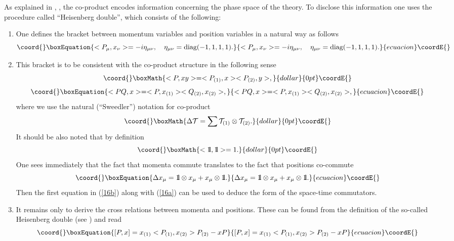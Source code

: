 \documentclass  [12pt] {article}
\def\bbbone{{\mathchoice {\rm 1\mskip-4mu l} {\rm 1\mskip-4mu l}
{\rm 1\mskip-4.5mu l} {\rm 1\mskip-5mu l}}}
\begin{document}
As explained in \cite{crossalg}, \cite{luno}, \cite{Kowalski-Glikman:2002jr}
the co-product encodes information concerning the phase space of the theory. To
disclose this information one uses the procedure called ``Heisenberg double'',
which consists of the following:

\begin{enumerate}
\item One defines the bracket \myHighlight{$<\star, \star>$}\coordHE{} between momentum variables \coordHE{} and position variables \coordHE{} in
a natural way as follows
\begin{equation}\coord{}\boxEquation{\label{16a}
 <P_\mu, x_\nu> =  -i \eta_{\mu\nu}, \quad \eta_{\mu\nu} = \mbox{diag}(-1,1,1,1).
}{<P_\mu, x_\nu> =  -i \eta_{\mu\nu}, \quad \eta_{\mu\nu} = \mbox{diag}(-1,1,1,1).
}{ecuacion}\coordE{}\end{equation}
\item This bracket is to be consistent with the co-product structure in the following sense
$$\coord{}\boxMath{
 <P, xy> = <P_{(1)}, x><P_{(2)}, y>,
 }{dollar}{0pt}\coordE{}$$
 \begin{equation}\coord{}\boxEquation{\label{16b}
 <PQ,x> =<P, x_{(1)}><Q_{(2)}, x_{(2)}>,
}{<PQ,x> =<P, x_{(1)}><Q_{(2)}, x_{(2)}>,
}{ecuacion}\coordE{}\end{equation}
where we use the natural (``Sweedler'') notation for co-product $$\coord{}\boxMath{\Delta {\cal
T} = \sum {\cal T}_{(1)} \otimes {\cal T}_{(2)}.}{dollar}{0pt}\coordE{}$$ It should be also  noted
that by definition
$$\coord{}\boxMath{<\bbbone, \bbbone> =1.}{dollar}{0pt}\coordE{}$$ One sees immediately that the fact that momenta
commute translates to the fact that positions co-commute
\begin{equation}\coord{}\boxEquation{\label{16c}
  \Delta x_\mu = \bbbone \otimes x_\mu + x_\mu \otimes \bbbone.
}{\Delta x_\mu = \bbbone \otimes x_\mu + x_\mu \otimes \bbbone.
}{ecuacion}\coordE{}\end{equation}
Then the first equation in (\ref{16b}) along with (\ref{16a}) can be used to
deduce the form of the space-time commutators.
\item  It remains only to derive the cross relations between momenta and positions. These can be found
from the definition of the so-called Heisenberg double (see \cite{crossalg})
and read
\begin{equation}\coord{}\boxEquation{\label{16d}
 [P,x] =  x_{(1)}<P_{(1)}, x_{(2)}>P_{(2)}-xP
}{[P,x] =  x_{(1)}<P_{(1)}, x_{(2)}>P_{(2)}-xP
}{ecuacion}\coordE{}\end{equation}
\end{enumerate}
\end{document}
